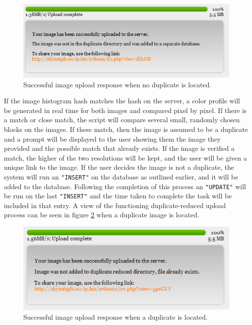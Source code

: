 \documentclass[11pt]{article}
\begin{document}
\begin{figure}[htbp]
\centering
\includegraphics[width=5.5in]{success_nodupfound}
\caption{Successful image upload response when no duplicate is located.}
\label{success_nodupfound}
\end{figure}

If the image histogram hash matches the hash on the server, a color profile will be generated in real time for both images and compared pixel by pixel. If there is a match or close match, the script will compare several small, randomly chosen blocks on the images. If these match, then the image is assumed to be a duplicate and a prompt will be displayed to the user showing them the image they provided and the possible match that already exists. If the image is verified a match, the higher of the two resolutions will be kept, and the user will be given a unique link to the image. If the user decides the image is not a duplicate, the system will run an {\tt "INSERT"} on the database as outlined earlier, and it will be added to the database. Following the completion of this process an {\tt "UPDATE"} will be run on the last {\tt "INSERT"} and the time taken to complete the task will be included in that entry. A view of the functioning duplicate-reduced upload process can be seen in figure \ref{success_dupfound} when a duplicate image is located.

\begin{figure}[htbp]
\centering
\includegraphics[width=5in]{success_dupfound}
\caption{Successful image upload response when a duplicate is located.}
\label{success_dupfound}
\end{figure}
\end{document}
